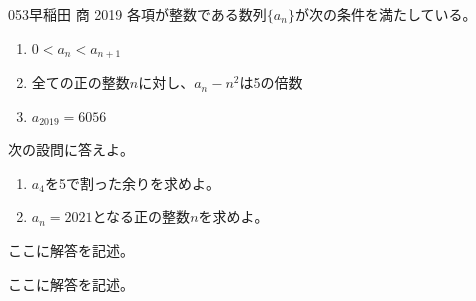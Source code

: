 \begin{prob}{053}{}{早稲田 商 2019}
 各項が整数である数列$\{a_n\}$が次の条件を満たしている。
 \begin{enumerate}[label=\roman*,align=CenterWithParen]
  \item $0<a_n<a_{n+1}$
  \item 全ての正の整数$n$に対し、$a_n-n^2$は5の倍数
  \item $a_{2019}=6056$
 \end{enumerate}
 次の設問に答えよ。
 \begin{enumerate}
  \item $a_4$を5で割った余りを求めよ。
  \item $a_n=2021$となる正の整数$n$を求めよ。
 \end{enumerate}
\end{prob}

ここに解答を記述。

ここに解答を記述。